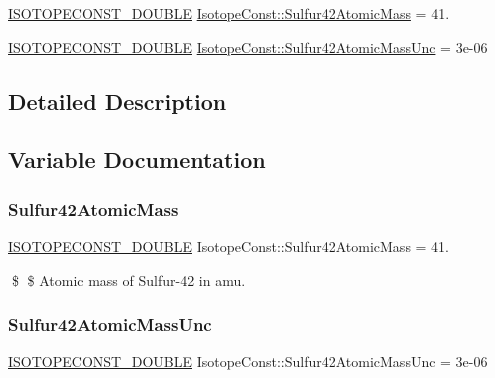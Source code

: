 \begin{DoxyCompactItemize}
\item 
\mbox{\hyperlink{group___isotope_const-_macros_ga8f45a7272ce02c0b4c65c44636ed719a}{I\+S\+O\+T\+O\+P\+E\+C\+O\+N\+S\+T\+\_\+\+D\+O\+U\+B\+LE}} \mbox{\hyperlink{group___isotope_const-_sulfur-_s42_ga8b76df8bc948bcb823b442c5de43c613}{Isotope\+Const\+::\+Sulfur42\+Atomic\+Mass}} = 41.
\item 
\mbox{\hyperlink{group___isotope_const-_macros_ga8f45a7272ce02c0b4c65c44636ed719a}{I\+S\+O\+T\+O\+P\+E\+C\+O\+N\+S\+T\+\_\+\+D\+O\+U\+B\+LE}} \mbox{\hyperlink{group___isotope_const-_sulfur-_s42_gac41af881d5bb7698cd4321eb8aeda540}{Isotope\+Const\+::\+Sulfur42\+Atomic\+Mass\+Unc}} = 3e-\/06
\end{DoxyCompactItemize}


\subsection{Detailed Description}


\subsection{Variable Documentation}
\mbox{\label{group___isotope_const-_sulfur-_s42_ga8b76df8bc948bcb823b442c5de43c613}} 
\subsubsection{\texorpdfstring{Sulfur42\+Atomic\+Mass}{Sulfur42AtomicMass}}
{\footnotesize\ttfamily \mbox{\hyperlink{group___isotope_const-_macros_ga8f45a7272ce02c0b4c65c44636ed719a}{I\+S\+O\+T\+O\+P\+E\+C\+O\+N\+S\+T\+\_\+\+D\+O\+U\+B\+LE}} Isotope\+Const\+::\+Sulfur42\+Atomic\+Mass = 41.}

\$ \$ Atomic mass of Sulfur-\/42 in amu. \mbox{\label{group___isotope_const-_sulfur-_s42_gac41af881d5bb7698cd4321eb8aeda540}} 
\subsubsection{\texorpdfstring{Sulfur42\+Atomic\+Mass\+Unc}{Sulfur42AtomicMassUnc}}
{\footnotesize\ttfamily \mbox{\hyperlink{group___isotope_const-_macros_ga8f45a7272ce02c0b4c65c44636ed719a}{I\+S\+O\+T\+O\+P\+E\+C\+O\+N\+S\+T\+\_\+\+D\+O\+U\+B\+LE}} Isotope\+Const\+::\+Sulfur42\+Atomic\+Mass\+Unc = 3e-\/06}

